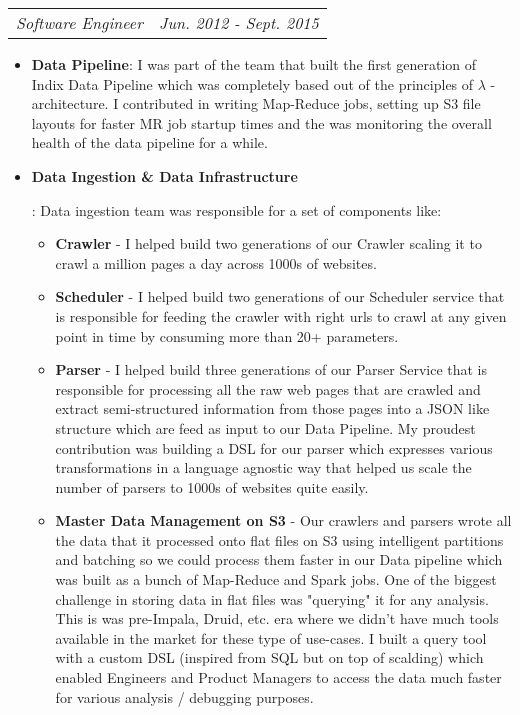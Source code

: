 \documentclass[letterpaper,11pt]{article}
\makeatletter
\newcommand{\resumeItem}[2]{
  \item\small{
    \textbf{#1}{: #2 \vspace{-2pt}}
  }
}
\newcommand{\resumeSubSubheading}[2]{
    \begin{tabular*}{0.97\textwidth}{l@{\extracolsep{\fill}}r}
      \textit{\small#1} & \textit{\small #2} \\
    \end{tabular*}\vspace{-5pt}
}
\newcommand{\resumeItemListStart}{\begin{itemize}}
\newcommand{\resumeItemListEnd}{\end{itemize}\vspace{-5pt}}
\makeatother
\begin{document}
    \resumeSubSubheading
      {Software Engineer}{Jun. 2012 - Sept. 2015}
      \resumeItemListStart
        \resumeItem{Data Pipeline}
        {
          I was part of the team that built the first generation of Indix Data Pipeline which was completely based out of the principles of $\lambda$ - architecture. I contributed in writing
          Map-Reduce jobs, setting up S3 file layouts for faster MR job startup times and the was monitoring the overall health of the data pipeline for a while.
        }
        \resumeItem{Data Ingestion \& Data Infrastructure}
        {
          Data ingestion team was responsible for a set of components like:
          \begin{itemize}
            \item{
              \textbf{Crawler} - I helped build two generations of our Crawler scaling it to crawl a million pages a day across 1000s of websites.
            }
            \item{
              \textbf{Scheduler} - I helped build two generations of our Scheduler service that is responsible for feeding the crawler with right urls to crawl at any given point in time by consuming more than 20+ parameters.
            }
            \item{
              \textbf{Parser} - I helped build three generations of our Parser Service that is responsible for processing all the raw web pages that are crawled and extract semi-structured information from those pages into a JSON like structure which are feed as input to our Data Pipeline. My proudest contribution was building a DSL for our parser which expresses various transformations in a language agnostic way that helped us scale the number of parsers to 1000s of websites quite easily.
            }
            \item{
              \textbf{Master Data Management on S3} - Our crawlers and parsers wrote all the data that it processed onto flat files on S3 using intelligent partitions and batching so we could process them faster in our Data pipeline which was built as a bunch of Map-Reduce and Spark jobs. One of the biggest challenge in storing data in flat files was "querying" it for any analysis. This is was pre-Impala, Druid, etc. era where we didn't have much tools available in the market for these type of use-cases. I built a query tool with a custom DSL (inspired from SQL but on top of scalding) which enabled Engineers and Product Managers to access the data much faster for various analysis / debugging purposes.
            }
          \end{itemize}\vspace{-4pt}
        }
      \resumeItemListEnd
\end{document}
